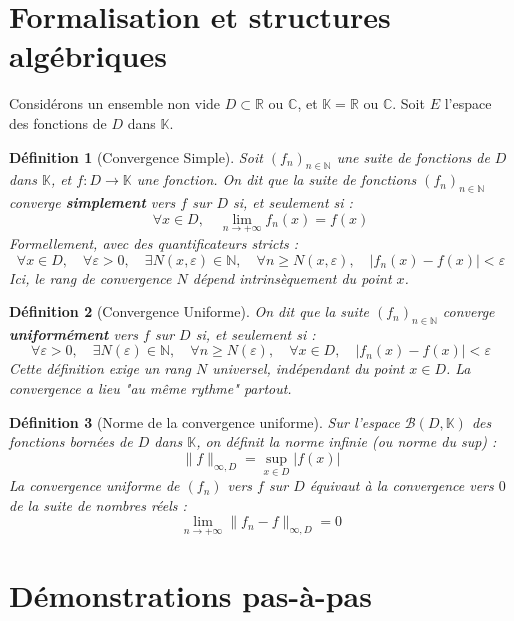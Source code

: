 \documentclass[11pt,a4paper]{article}
\newtheorem{definition}{Définition}
\begin{document}
\section{Formalisation et structures algébriques}

Considérons un ensemble non vide $D \subset \mathbb{R}$ ou $\mathbb{C}$, et $\mathbb{K} = \mathbb{R}$ ou $\mathbb{C}$. Soit $E$ l'espace des fonctions de $D$ dans $\mathbb{K}$.

\begin{definition}[Convergence Simple]
Soit $(f_n)_{n \in \mathbb{N}}$ une suite de fonctions de $D$ dans $\mathbb{K}$, et $f: D \to \mathbb{K}$ une fonction.
On dit que la suite de fonctions $(f_n)_{n \in \mathbb{N}}$ converge \textbf{simplement} vers $f$ sur $D$ si, et seulement si :
$$\forall x \in D, \quad \lim_{n \to +\infty} f_n(x) = f(x)$$
Formellement, avec des quantificateurs stricts :
$$\forall x \in D, \quad \forall \varepsilon > 0, \quad \exists N(x, \varepsilon) \in \mathbb{N}, \quad \forall n \ge N(x, \varepsilon), \quad |f_n(x) - f(x)| < \varepsilon$$
Ici, le rang de convergence $N$ dépend intrinsèquement du point $x$.
\end{definition}

\begin{definition}[Convergence Uniforme]
On dit que la suite $(f_n)_{n \in \mathbb{N}}$ converge \textbf{uniformément} vers $f$ sur $D$ si, et seulement si :
$$\forall \varepsilon > 0, \quad \exists N(\varepsilon) \in \mathbb{N}, \quad \forall n \ge N(\varepsilon), \quad \forall x \in D, \quad |f_n(x) - f(x)| < \varepsilon$$
Cette définition exige un rang $N$ universel, indépendant du point $x \in D$. La convergence a lieu "au même rythme" partout.
\end{definition}

\begin{definition}[Norme de la convergence uniforme]
Sur l'espace $\mathcal{B}(D, \mathbb{K})$ des fonctions bornées de $D$ dans $\mathbb{K}$, on définit la norme infinie (ou norme du sup) :
$$\|f\|_{\infty, D} = \sup_{x \in D} |f(x)|$$
La convergence uniforme de $(f_n)$ vers $f$ sur $D$ équivaut à la convergence vers $0$ de la suite de nombres réels :
$$\lim_{n \to +\infty} \|f_n - f\|_{\infty, D} = 0$$
\end{definition}

\section{Démonstrations pas-à-pas}
\end{document}
